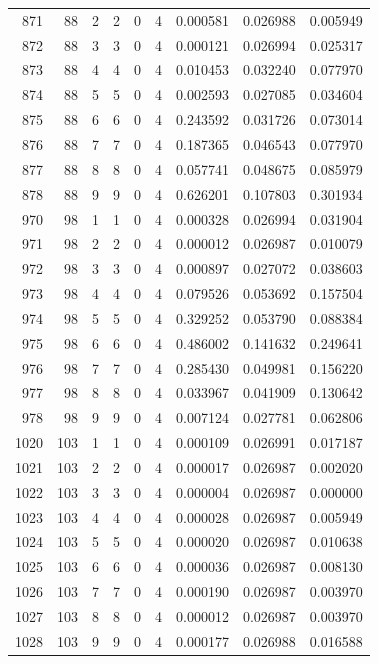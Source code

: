 \begin{longtable}{rrrrrrrrr}
871 & 88 & 2 & 2 & 0 & 4 & 0.000581 & 0.026988 & 0.005949 \\
872 & 88 & 3 & 3 & 0 & 4 & 0.000121 & 0.026994 & 0.025317 \\
873 & 88 & 4 & 4 & 0 & 4 & 0.010453 & 0.032240 & 0.077970 \\
874 & 88 & 5 & 5 & 0 & 4 & 0.002593 & 0.027085 & 0.034604 \\
875 & 88 & 6 & 6 & 0 & 4 & 0.243592 & 0.031726 & 0.073014 \\
876 & 88 & 7 & 7 & 0 & 4 & 0.187365 & 0.046543 & 0.077970 \\
877 & 88 & 8 & 8 & 0 & 4 & 0.057741 & 0.048675 & 0.085979 \\
878 & 88 & 9 & 9 & 0 & 4 & 0.626201 & 0.107803 & 0.301934 \\
970 & 98 & 1 & 1 & 0 & 4 & 0.000328 & 0.026994 & 0.031904 \\
971 & 98 & 2 & 2 & 0 & 4 & 0.000012 & 0.026987 & 0.010079 \\
972 & 98 & 3 & 3 & 0 & 4 & 0.000897 & 0.027072 & 0.038603 \\
973 & 98 & 4 & 4 & 0 & 4 & 0.079526 & 0.053692 & 0.157504 \\
974 & 98 & 5 & 5 & 0 & 4 & 0.329252 & 0.053790 & 0.088384 \\
975 & 98 & 6 & 6 & 0 & 4 & 0.486002 & 0.141632 & 0.249641 \\
976 & 98 & 7 & 7 & 0 & 4 & 0.285430 & 0.049981 & 0.156220 \\
977 & 98 & 8 & 8 & 0 & 4 & 0.033967 & 0.041909 & 0.130642 \\
978 & 98 & 9 & 9 & 0 & 4 & 0.007124 & 0.027781 & 0.062806 \\
1020 & 103 & 1 & 1 & 0 & 4 & 0.000109 & 0.026991 & 0.017187 \\
1021 & 103 & 2 & 2 & 0 & 4 & 0.000017 & 0.026987 & 0.002020 \\
1022 & 103 & 3 & 3 & 0 & 4 & 0.000004 & 0.026987 & 0.000000 \\
1023 & 103 & 4 & 4 & 0 & 4 & 0.000028 & 0.026987 & 0.005949 \\
1024 & 103 & 5 & 5 & 0 & 4 & 0.000020 & 0.026987 & 0.010638 \\
1025 & 103 & 6 & 6 & 0 & 4 & 0.000036 & 0.026987 & 0.008130 \\
1026 & 103 & 7 & 7 & 0 & 4 & 0.000190 & 0.026987 & 0.003970 \\
1027 & 103 & 8 & 8 & 0 & 4 & 0.000012 & 0.026987 & 0.003970 \\
1028 & 103 & 9 & 9 & 0 & 4 & 0.000177 & 0.026988 & 0.016588 \\

\end{longtable}
